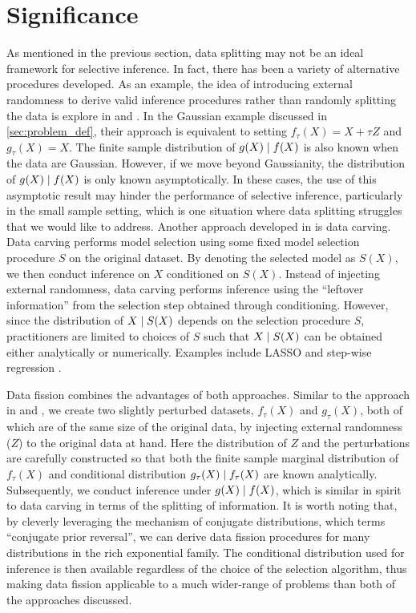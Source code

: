 \section{Significance}
As mentioned in the previous section, data splitting may not be an ideal framework for selective inference. In fact, there has been a variety of alternative procedures developed. As an example, the idea of introducing external randomness to derive valid inference procedures rather than randomly splitting the data is explore in \cite{tian2018selective} and \cite{rasines2021splitting}. In the Gaussian example discussed in \cref{sec:problem_def}, their approach is equivalent to setting $f_\tau(X) = X+\tau Z$ and $g_\tau(X) = X$. The finite sample distribution of $g(X) \mid f(X)$ is also known when the data are Gaussian. However, if we move beyond Gaussianity, the distribution of $g(X) \mid f(X)$ is only known asymptotically. In these cases, the use of this asymptotic result may hinder the performance of selective inference, particularly in the small sample setting, which is one situation where data splitting struggles that we would like to address. Another approach developed in \cite{fithian2014optimal} is data carving. Data carving performs model selection using some fixed model selection procedure $S$ on the original dataset. By denoting the selected model as $S(X)$, we then conduct inference on $X$ conditioned on $S(X)$. Instead of injecting external randomness, data carving performs inference using the ``leftover information'' from the selection step obtained through conditioning. However, since the distribution of $X\mid S(X)$ depends on the selection procedure $S$, practitioners are limited to choices of $S$ such that $X\mid S(X)$ can be obtained either analytically or numerically. Examples include LASSO \citep{lee2016exact} and step-wise regression \citep{tibshirani2016exact}.

Data fission combines the advantages of both approaches. Similar to the approach in \cite{tian2018selective} and \cite{rasines2021splitting}, we create two slightly perturbed datasets, $f_\tau(X)$ and $g_\tau(X)$, both of which are of the same size of the original data, by injecting external randomness ($Z$) to the original data at hand. Here the distribution of $Z$ and the perturbations are carefully constructed so that both the finite sample marginal distribution of $f_\tau(X)$ and conditional distribution $g_\tau(X)\mid f_\tau(X)$ are known analytically. Subsequently, we conduct inference under $g(X)\mid f(X)$, which is similar in spirit to data carving in terms of the splitting of information. It is worth noting that, by cleverly leveraging the mechanism of conjugate distributions, which \cite{leiner2022data} terms ``conjugate prior reversal'', we can derive data fission procedures for many distributions in the rich exponential family. The conditional distribution used for inference is then available regardless of the choice of the selection algorithm, thus making data fission applicable to a much wider-range of problems than both of the approaches discussed.

